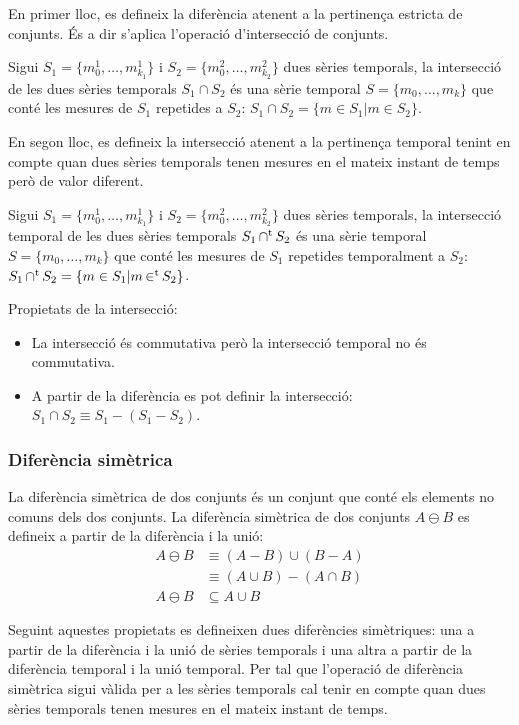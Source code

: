 En primer lloc, es defineix la diferència atenent a la pertinença
estricta de conjunts. És a dir s'aplica l'operació d'intersecció de
conjunts.
\begin{definition}[intersecció]
  Sigui $S_1=\{m_0^1, \dotsc, m_{k_1}^1\}$ i $S_2=\{m_0^2, \dotsc,
  m_{k_2}^2\}$ dues sèries temporals, la intersecció de les dues
  sèries temporals $S_1 \cap S_2$ és una sèrie temporal $S=\{m_0,
  \dotsc, m_k\}$ que conté les mesures de $S_1$ repetides a $S_2$:
  $S_1 \cap S_2 = \{ m \in S_1 | m \in S_2 \}$.
\end{definition}

En segon lloc, es defineix la intersecció atenent a la pertinença
temporal tenint en compte quan dues sèries temporals tenen mesures en
el mateix instant de temps però de valor diferent.
\begin{definition}
  Sigui $S_1=\{m_0^1, \dotsc, m_{k_1}^1\}$ i $S_2=\{m_0^2, \dotsc,
  m_{k_2}^2\}$ dues sèries temporals, la intersecció temporal de les
  dues sèries temporals $S_1 \operatorname*{\cap^t} S_2$ és una sèrie temporal
  $S=\{m_0, \dotsc, m_k\}$ que conté les mesures de $S_1$ repetides
  temporalment a $S_2$: $S_1 \operatorname*{\cap^t} S_2 = \{ m \in S_1 | m \operatorname*{\in^t} S_2
  \}$.
\end{definition}

Propietats de la intersecció:
\begin{itemize}
\item La intersecció és commutativa però la intersecció temporal no és
  commutativa.
\item A partir de la diferència es pot definir la intersecció: $S_1
  \cap S_2 \equiv S_1 - (S_1 - S_2)$.
\end{itemize}


\subsubsection{Diferència simètrica}

La diferència simètrica de dos conjunts és un conjunt que conté els
elements no comuns dels dos conjunts. La diferència simètrica de dos
conjunts $A \ominus B$ es defineix a partir de la diferència i la
unió:
\begin{align*}
A \ominus B  & \equiv (A-B)\cup(B-A)\\
             & \equiv (A\cup B)-(A\cap B)  \\
A \ominus B  & \subseteq A\cup B
\end{align*}

Seguint aquestes propietats es defineixen dues diferències
simètriques: una a partir de la diferència i la unió de sèries
temporals i una altra a partir de la diferència temporal i la unió
temporal.  Per tal que l'operació de diferència simètrica sigui vàlida
per a les sèries temporals cal tenir en compte quan dues sèries
temporals tenen mesures en el mateix instant de temps.


